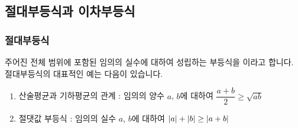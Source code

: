 \subsection{절대부등식과 이차부등식}
\subsubsection{절대부등식}
주어진 전체 범위에 포함된 임의의 실수에 대하여 성립하는 부등식을 이라고 합니다. 절대부등식의 대표적인 예는 다음이 있습니다.
\begin{enumerate}[label={\onum*}]
	\item 산술평균과 기하평균의 관계 : 임의의 양수 $a$, $b$에 대하여 $\dfrac{a+b}{2} \ge \sqrt{ab}$
	\item 절댓값 부등식 : 임의의 실수 $a$, $b$에 대하여 $\left|a\right| + \left|b\right| \ge \left|a+b\right| $
\end{enumerate}
